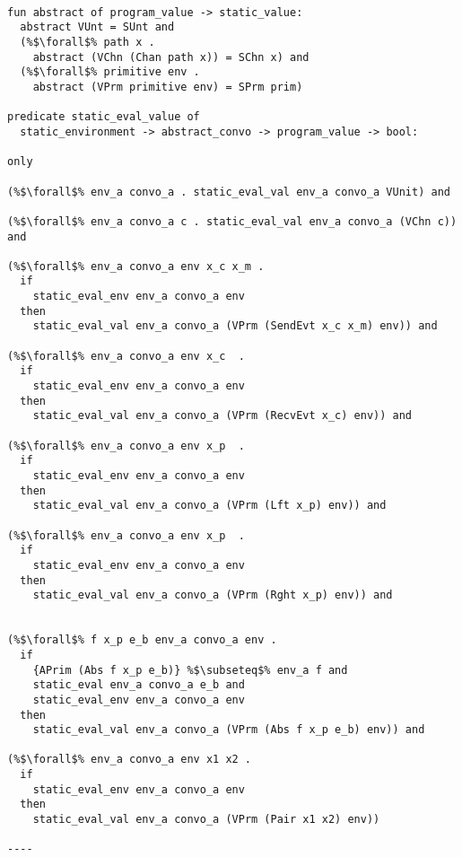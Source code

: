 \documentclass{article}
\begin{document}
\begin{lstlisting}[language=logic, escapechar=\%]

fun abstract of program_value -> static_value:
  abstract VUnt = SUnt and 
  (%$\forall$% path x . 
    abstract (VChn (Chan path x)) = SChn x) and
  (%$\forall$% primitive env .
    abstract (VPrm primitive env) = SPrm prim)

predicate static_eval_value of
  static_environment -> abstract_convo -> program_value -> bool: 

only

(%$\forall$% env_a convo_a . static_eval_val env_a convo_a VUnit) and

(%$\forall$% env_a convo_a c . static_eval_val env_a convo_a (VChn c)) and

(%$\forall$% env_a convo_a env x_c x_m .
  if
    static_eval_env env_a convo_a env
  then
    static_eval_val env_a convo_a (VPrm (SendEvt x_c x_m) env)) and

(%$\forall$% env_a convo_a env x_c  .
  if
    static_eval_env env_a convo_a env
  then
    static_eval_val env_a convo_a (VPrm (RecvEvt x_c) env)) and

(%$\forall$% env_a convo_a env x_p  .
  if
    static_eval_env env_a convo_a env
  then
    static_eval_val env_a convo_a (VPrm (Lft x_p) env)) and

(%$\forall$% env_a convo_a env x_p  .
  if
    static_eval_env env_a convo_a env
  then
    static_eval_val env_a convo_a (VPrm (Rght x_p) env)) and


(%$\forall$% f x_p e_b env_a convo_a env .
  if
    {APrim (Abs f x_p e_b)} %$\subseteq$% env_a f and 
    static_eval env_a convo_a e_b and 
    static_eval_env env_a convo_a env
  then
    static_eval_val env_a convo_a (VPrm (Abs f x_p e_b) env)) and

(%$\forall$% env_a convo_a env x1 x2 .
  if
    static_eval_env env_a convo_a env
  then
    static_eval_val env_a convo_a (VPrm (Pair x1 x2) env))

----

\end{lstlisting}
\end{document}
